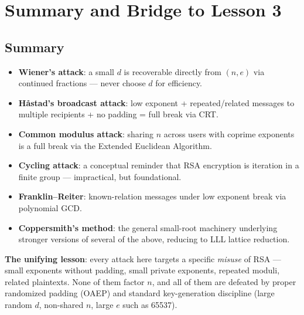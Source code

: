 \newpage
\section{Summary and Bridge to Lesson 3}

\subsection*{Summary}
\begin{itemize}
\item \textbf{Wiener's attack}: a small $d$ is recoverable directly from $(n,e)$ via continued fractions — never choose $d$ for efficiency.
\item \textbf{Håstad's broadcast attack}: low exponent + repeated/related messages to multiple recipients + no padding = full break via CRT.
\item \textbf{Common modulus attack}: sharing $n$ across users with coprime exponents is a full break via the Extended Euclidean Algorithm.
\item \textbf{Cycling attack}: a conceptual reminder that RSA encryption is iteration in a finite group — impractical, but foundational.
\item \textbf{Franklin--Reiter}: known-relation messages under low exponent break via polynomial GCD.
\item \textbf{Coppersmith's method}: the general small-root machinery underlying stronger versions of several of the above, reducing to LLL lattice reduction.
\end{itemize}
\textbf{The unifying lesson}: every attack here targets a specific \emph{misuse} of RSA — small exponents without padding, small private exponents, repeated moduli, related plaintexts. None of them factor $n$, and all of them are defeated by proper randomized padding (OAEP) and standard key-generation discipline (large random $d$, non-shared $n$, large $e$ such as 65537).

